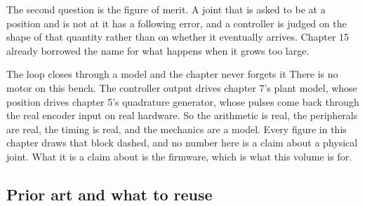 The second question is the figure of merit. A joint that is asked to be at a
position and is not at it has a following error, and a controller is judged on
the shape of that quantity rather than on whether it eventually arrives. Chapter
15 already borrowed the name for what happens when it grows too large.

\begin{note}{The loop closes through a model and the chapter never forgets it}
There is no motor on this bench. The controller output drives chapter 7's plant
model, whose position drives chapter 5's quadrature generator, whose pulses come
back through the real encoder input on real hardware. So the arithmetic is real,
the peripherals are real, the timing is real, and the mechanics are a model.
Every figure in this chapter draws that block dashed, and no number here is a
claim about a physical joint. What it is a claim about is the firmware, which is
what this volume is for.
\end{note}

\subsection*{Prior art and what to reuse}

